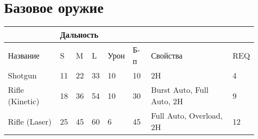         \section*{Базовое оружие}
        \begin{table}[H]
            \centering
            \begin{tabular}{|l|lll|l|l|l|l|}
            \hline
                            & \multicolumn{3}{l|}{Дальность}                         &      &     &                           &     \\ \hline
            Название        & \multicolumn{1}{l|}{S}  & \multicolumn{1}{l|}{M}  & L  & Урон & Б-п & Свойства                  & REQ \\ \hline
            Shotgun         & \multicolumn{1}{l|}{11} & \multicolumn{1}{l|}{22} & 33 & 10   & 10  & 2H                        & 4   \\ \hline
            Rifle (Kinetic) & \multicolumn{1}{l|}{18} & \multicolumn{1}{l|}{36} & 54 & 10   & 30  & Burst Auto, Full Auto, 2H & 9   \\ \hline
            Rifle (Laser)   & \multicolumn{1}{l|}{25} & \multicolumn{1}{l|}{45} & 60 & 6    & 45  & Full Auto, Overload, 2H   & 12  \\ \hline
            \end{tabular}
            \end{table}

